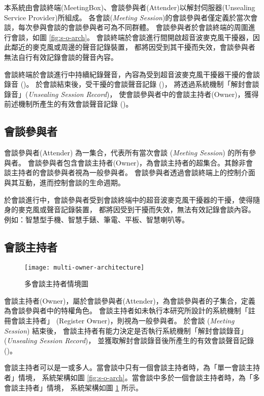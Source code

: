     本系統由會談終端(MeetingBox)、會談參與者(Attender)以解封伺服器(Unsealing Service Provider)所組成。
各會談({\it Meeting Session})的會談參與者僅定義於當次會談，每次參與會談的會談參與者可為不同群體。
會談參與者於會談終端的周圍進行會談，如圖 \ref{fig:s-o-arch}。
會談終端於會談進行間開啟超音波麥克風干擾器，因此鄰近的麥克風或周邊的聲音記錄裝置，
都將因受到其干擾而失效，會談參與者無法自行有效記錄會談的聲音內容。

    會談終端於會談進行中持續紀錄聲音，內容為受到超音波麥克風干擾器干擾的會談錄音 (\DEFrecJ)。
於會談結束後，受干擾的會談聲音記錄 (\DEFrecJ)，
將透過系統機制「解封會談錄音」({\it Unsealing Session Record})，
使會談參與者中的會談主持者(Owner)，獲得前述機制所產生的有效會談聲音記錄 (\DEFrecREV)。


\subsection{會談參與者}

    會談參與者(Attender) 為一集合，代表所有當次會談 ({\it Meeting Session}) 的所有參與者。
會談參與者包含會談主持者(Owner)，為會談主持者的超集合。其餘非會談主持者的會談參與者視為一般參與者。
會談參與者透過會談終端上的控制介面與其互動，進而控制會談的生命週期。

    於會談進行中，會談參與者受到會談終端中的超音波麥克風干擾器的干擾，使得隨身的麥克風或聲音記錄裝置，
都將因受到干擾而失效，無法有效記錄會談內容。例如：智慧型手機、智慧手錶、筆電、平板、智慧喇叭等。


\subsection{會談主持者}

\begin{figure}[H]
    \centering
    \texttt{[image: multi-owner-architecture]}
    \caption{多會談主持者情境圖}
    \label{fig:m-o-arch}
\end{figure}

    會談主持者(Owner)，屬於會談參與者(Attender)，為會談參與者的子集合，定義為會談參與者中的特權角色。
會談主持者如未執行本研究所設計的系統機制「註冊會談主持者」 (Register Owner)，則視為一般參與者。
於會談 ({\it Meeting Session}) 結束後，
會談主持者有能力決定是否執行系統機制「解封會談錄音」({\it Unsealing Session Record})，
並獲取解封會談錄音後所產生的有效會談聲音記錄 (\DEFrecREV)。

    會談主持者可以是一或多人。當會談中只有一個會談主持者時，為「單一會談主持者」情境，
系統架構如圖 \ref{fig:s-o-arch}。當會談中多於一個會談主持者時，為「多會談主持者」情境，
系統架構如圖 \ref{fig:m-o-arch} 所示。

